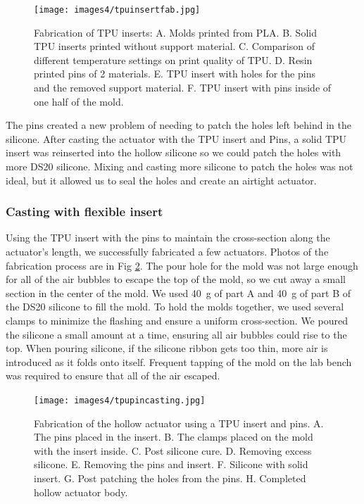 \begin{figure}[ht]
    \centering
    \texttt{[image: images4/tpuinsertfab.jpg]}
    \caption{Fabrication of TPU inserts: A. Molds printed from PLA. B. Solid TPU inserts printed without support material. C. Comparison of different temperature settings on print quality of TPU. D. Resin printed pins of 2 materials. E. TPU insert with holes for the pins and the removed support material. F. TPU insert with pins inside of one half of the mold.}
    \label{fig:tpuinsert}
\end{figure}

The pins created a new problem of needing to patch the holes left behind in the silicone. After casting the actuator with the TPU insert and Pins, a solid TPU insert was reinserted into the hollow silicone so we could patch the holes with more DS20 silicone. Mixing and casting more silicone to patch the holes was not ideal, but it allowed us to seal the holes and create an airtight actuator. 

\clearpage
\subsubsection{Casting with flexible insert}
Using the TPU insert with the pins to maintain the cross-section along the actuator's length, we successfully fabricated a few actuators. Photos of the fabrication process are in Fig \ref{fig:tpupinfab}. The pour hole for the mold was not large enough for all of the air bubbles to escape the top of the mold, so we cut away a small section in the center of the mold. We used 40~g of part A and 40~g of part B of the DS20 silicone to fill the mold. To hold the molds together, we used several clamps to minimize the flashing and ensure a uniform cross-section. We poured the silicone a small amount at a time, ensuring all air bubbles could rise to the top. When pouring silicone, if the silicone ribbon gets too thin, more air is introduced as it folds onto itself. Frequent tapping of the mold on the lab bench was required to ensure that all of the air escaped. 

\begin{figure}[ht]
    \centering
    \texttt{[image: images4/tpupincasting.jpg]}
    \caption{Fabrication of the hollow actuator using a TPU insert and pins. A. The pins placed in the insert. B. The clamps placed on the mold with the insert inside. C. Post silicone cure. D. Removing excess silicone. E. Removing the pins and insert. F. Silicone with solid insert. G. Post patching the holes from the pins. H. Completed hollow actuator body.}
    \label{fig:tpupinfab}
\end{figure}

